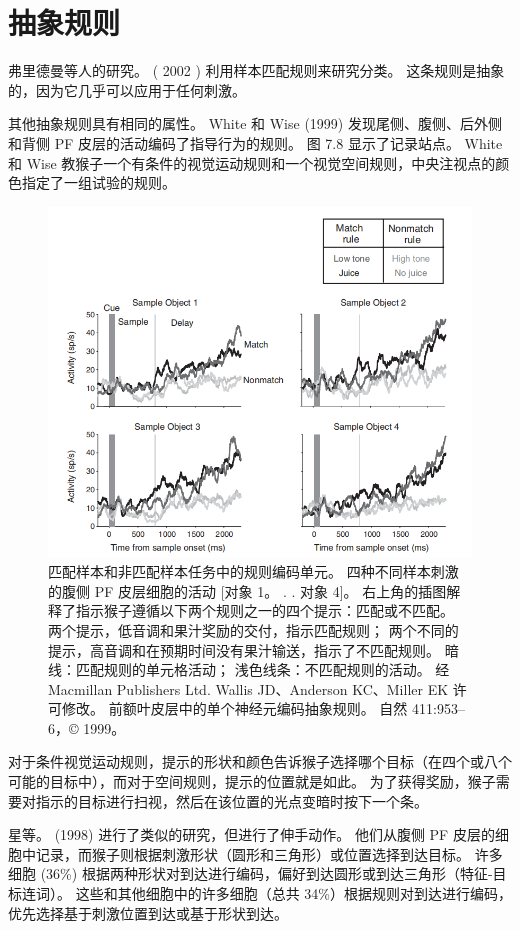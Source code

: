\section{抽象规则}
\par
弗里德曼等人的研究。 ( 2002 ) 利用样本匹配规则来研究分类。 
这条规则是抽象的，因为它几乎可以应用于任何刺激。
\par
其他抽象规则具有相同的属性。
White 和 Wise (1999) 发现尾侧、腹侧、后外侧和背侧 PF 皮层的活动编码了指导行为的规则。 
图 7.8 显示了记录站点。 White 和 Wise 教猴子一个有条件的视觉运动规则和一个视觉空间规则，中央注视点的颜色指定了一组试验的规则。
\begin{figure}
	\centering
	\includegraphics[width=0.6\linewidth]{image_pfc/Fig_7_9}
	\caption{匹配样本和非匹配样本任务中的规则编码单元。
		四种不同样本刺激的腹侧 PF 皮层细胞的活动 [对象 1。 . . 对象 4]。 
		右上角的插图解释了指示猴子遵循以下两个规则之一的四个提示：匹配或不匹配。 
		两个提示，低音调和果汁奖励的交付，指示匹配规则； 两个不同的提示，高音调和在预期时间没有果汁输送，指示了不匹配规则。 
		暗线：匹配规则的单元格活动； 浅色线条：不匹配规则的活动。 
		经 Macmillan Publishers Ltd. Wallis JD、Anderson KC、Miller EK 许可修改。 
		前额叶皮层中的单个神经元编码抽象规则。 自然 411:953–6，© 1999。}
	\label{fig:fig}
\end{figure}
\par
对于条件视觉运动规则，提示的形状和颜色告诉猴子选择哪个目标（在四个或八个可能的目标中），而对于空间规则，提示的位置就是如此。 
为了获得奖励，猴子需要对指示的目标进行扫视，然后在该位置的光点变暗时按下一个条。
\par
 星等。 (1998) 进行了类似的研究，但进行了伸手动作。 
 他们从腹侧 PF 皮层的细胞中记录，而猴子则根据刺激形状（圆形和三角形）或位置选择到达目标。 
 许多细胞 (36\%) 根据两种形状对到达进行编码，偏好到达圆形或到达三角形（特征-目标连词）。 
 这些和其他细胞中的许多细胞（总共 34\%）根据规则对到达进行编码，优先选择基于刺激位置到达或基于形状到达。 
